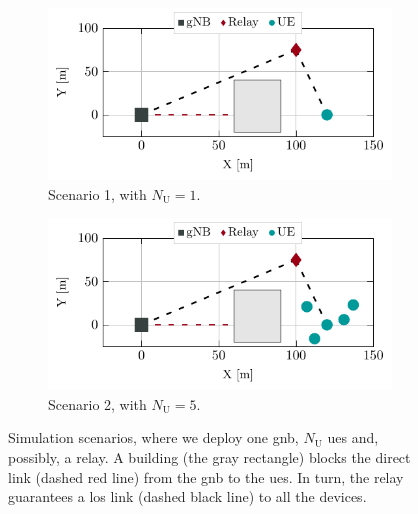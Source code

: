 \begin{figure}[t!]
  \centering
    \begin{subfigure}[t]{\columnwidth}
    \includegraphics[width=0.75\columnwidth]{Figures/IrsSimulation/Scenario1.pdf}
    \caption{Scenario 1, with $N_{\mathrm U} = 1$.}
    \label{Fig:s1}
    \end{subfigure}
     \begin{subfigure}[t]{\columnwidth}
    \includegraphics[width=0.75\columnwidth]{Figures/IrsSimulation/Scenario2.pdf}
    \caption{Scenario 2, with $N_{\mathrm U} = 5$.}
    \label{Fig:s2}
    \end{subfigure}
     \caption{Simulation scenarios, where we deploy one \gls{gnb}, $N_{\mathrm U}$ \glspl{ue} and, possibly, a relay. A building (the gray rectangle) blocks the direct link (dashed red line) from the \gls{gnb} to the \glspl{ue}. In turn, the relay guarantees a \gls{los} link (dashed black line) to all the devices.}
    \label{Fig:scenarios}
\end{figure}

